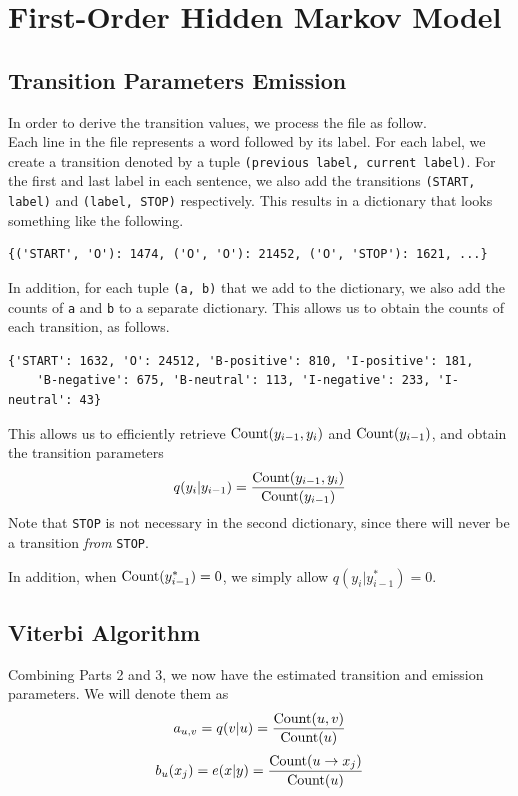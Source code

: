 \documentclass{article}
\numberwithin{equation}{section}
\begin{document}
\section{First-Order Hidden Markov Model}
\subsection{Transition Parameters Emission}
In order to derive the transition values, we process the file as follow.\\
Each line in the file represents a word followed by its label. For each label, we create a transition denoted by a tuple \lstinline{(previous label, current label)}. For the first and last label in each sentence, we also add the transitions \lstinline{(START, label)} and \lstinline{(label, STOP)} respectively. This results in a dictionary that looks something like the following.

\begin{verbatim}
{('START', 'O'): 1474, ('O', 'O'): 21452, ('O', 'STOP'): 1621, ...}
\end{verbatim}

In addition, for each tuple \lstinline{(a, b)} that we add to the dictionary, we also add the counts of \lstinline{a} and \lstinline{b} to a separate dictionary. This allows us to obtain the counts of each transition, as follows.

\begin{verbatim}
{'START': 1632, 'O': 24512, 'B-positive': 810, 'I-positive': 181,
    'B-negative': 675, 'B-neutral': 113, 'I-negative': 233, 'I-neutral': 43}
\end{verbatim}

This allows us to efficiently retrieve $\text{\lstinline{Count}}(y_{i-1}, y_i)$ and $\text{\lstinline{Count}}(y_{i-1})$, and obtain the transition parameters
	$$q(y_i | y_{i-1}) = \frac{\text{\lstinline{Count}}(y_{i-1}, y_i)}{\text{\lstinline{Count}}(y_{i-1})}$$
Note that \lstinline{STOP} is not necessary in the second dictionary, since there will never be a transition \emph{from} \lstinline{STOP}.

In addition, when $\text{\lstinline{Count}}(y^*_{i-1}) = 0$, we simply allow $q(y_i | y^*_{i-1}) = 0$.

\subsection{Viterbi Algorithm}
Combining Parts 2 and 3, we now have the estimated transition and emission parameters. We will denote them as
	$$ a_{u, v} = q(v | u) = \frac{\text{\lstinline{Count}}(u, v)}{\text{\lstinline{Count}}(u)} $$
	$$ b_u(x_j) = e(x | y) = \frac{\text{\lstinline{Count}}(u \rightarrow x_j)}{\text{\lstinline{Count}}(u)} $$
\end{document}
